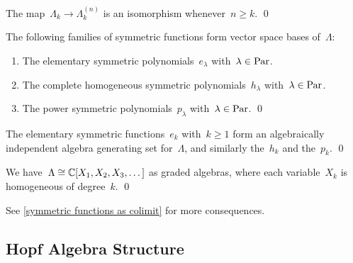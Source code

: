 \documentclass[a4paper,11pt]{scrartcl}
\begin{document}
\begin{corollary}
  \label{iso in each degree for sufficiently large}
  The map~$\Lambda_k \to \Lambda^{(n)}_k$ is an isomorphism whenever~$n \geq k$.
  \qed
\end{corollary}

\begin{corollary}
  The following families of symmetric functions form vector space bases of~$\Lambda$:
  \begin{enumerate}
    \item
      The elementary symmetric polynomials~$e_\lambda$ with~$\lambda \in \mathrm{Par}$.
    \item
      The complete homogeneous symmetric polynomials~$h_\lambda$ with~$\lambda \in \mathrm{Par}$.
    \item
      The power symmetric polynomials~$p_\lambda$ with~$\lambda \in \mathrm{Par}$.
    \qed
  \end{enumerate}
\end{corollary}

\begin{corollary}
  The elementary symmetric functions~$e_k$ with~$k \geq 1$ form an algebraically independent algebra generating set for~$\Lambda$, and similarly the~$h_k$ and the~$p_k$.
  \qed
\end{corollary}

\begin{corollary}
  We have~$\Lambda \cong \mathbb{C}[X_1, X_2, X_3, \dotsc]$ as graded algebras, where each variable~$X_k$ is homogeneous of degree~$k$.
  \qed
\end{corollary}

See \cref{symmetric functions as colimit} for more consequences.



\subsection{Hopf Algebra Structure}
\end{document}
